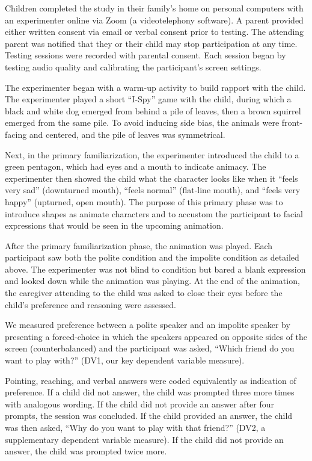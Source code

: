 \documentclass[
  english,
  man,floatsintext]{apa6}
\begin{document}
Children completed the study in their family's home on personal computers with an experimenter online via Zoom (a videotelephony software). A parent provided either written consent via email or verbal consent prior to testing. The attending parent was notified that they or their child may stop participation at any time. Testing sessions were recorded with parental consent. Each session began by testing audio quality and calibrating the participant's screen settings.

The experimenter began with a warm-up activity to build rapport with the child. The experimenter played a short ``I-Spy'' game with the child, during which a black and white dog emerged from behind a pile of leaves, then a brown squirrel emerged from the same pile. To avoid inducing side bias, the animals were front-facing and centered, and the pile of leaves was symmetrical.

Next, in the primary familiarization, the experimenter introduced the child to a green pentagon, which had eyes and a mouth to indicate animacy. The experimenter then showed the child what the character looks like when it ``feels very sad'' (downturned mouth), ``feels normal'' (flat-line mouth), and ``feels very happy'' (upturned, open mouth). The purpose of this primary phase was to introduce shapes as animate characters and to accustom the participant to facial expressions that would be seen in the upcoming animation.

After the primary familiarization phase, the animation was played. Each participant saw both the polite condition and the impolite condition as detailed above. The experimenter was not blind to condition but bared a blank expression and looked down while the animation was playing. At the end of the animation, the caregiver attending to the child was asked to close their eyes before the child's preference and reasoning were assessed.

We measured preference between a polite speaker and an impolite speaker by presenting a forced-choice in which the speakers appeared on opposite sides of the screen (counterbalanced) and the participant was asked, ``Which friend do you want to play with?'' (DV1, our key dependent variable measure).

Pointing, reaching, and verbal answers were coded equivalently as indication of preference. If a child did not answer, the child was prompted three more times with analogous wording. If the child did not provide an answer after four prompts, the session was concluded. If the child provided an answer, the child was then asked, ``Why do you want to play with that friend?'' (DV2, a supplementary dependent variable measure). If the child did not provide an answer, the child was prompted twice more.
\end{document}
